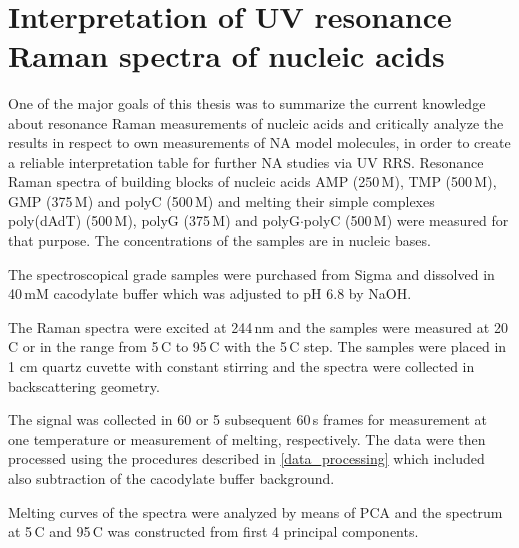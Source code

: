 \\
\section{Interpretation of UV resonance Raman spectra of nucleic acids}
\label{interpretation}

\newlength{\assignwnl}
\settowidth{\assignwnl}{0000}
\newlength{\assignwnil}
\settowidth{\assignwnil}{(000)}
\newlength{\assignwnspl}
\setlength{\assignwnspl}{0.2cm}
\newlength{\assigntabrowindent}
\setlength{\assigntabrowindent}{.7em}


One of the major goals of this thesis was to summarize the current knowledge
about resonance Raman measurements of nucleic acids and critically analyze the
results in respect to own measurements of NA model molecules, in order to
create a reliable interpretation table for further NA studies via UV RRS.
Resonance Raman spectra of building blocks of nucleic acids AMP (250\,M),
TMP (500\,M), GMP (375\,M) and polyC (500\,M) and melting their
simple complexes poly(dAdT) (500\,M), polyG (375\,M) and
polyG$\cdot$polyC (500\,M) were measured for that purpose.
The concentrations of the samples are in nucleic bases.

The spectroscopical grade samples were purchased from Sigma and dissolved in
40\,mM cacodylate buffer which was adjusted to pH 6.8 by NaOH.

The Raman spectra were excited at 244\,nm and the samples were measured at
20\,\textdegree{}C or in the range from 5\,\textdegree{}C to 95\,\textdegree{}C
with the 5\,\textdegree{}C step. The samples were placed in 1 cm quartz cuvette
with constant stirring and the spectra were collected in backscattering
geometry.

The signal was collected in 60 or 5 subsequent 60\,s frames for measurement
at one temperature or measurement of melting, respectively.
The data were then processed using the procedures described in
\cref{data_processing}
which included also subtraction of the cacodylate buffer background.

Melting curves of the spectra were analyzed by means of PCA and the spectrum
at 5\,\textdegree{}C and 95\,\textdegree{}C was constructed from first 4
principal components.

